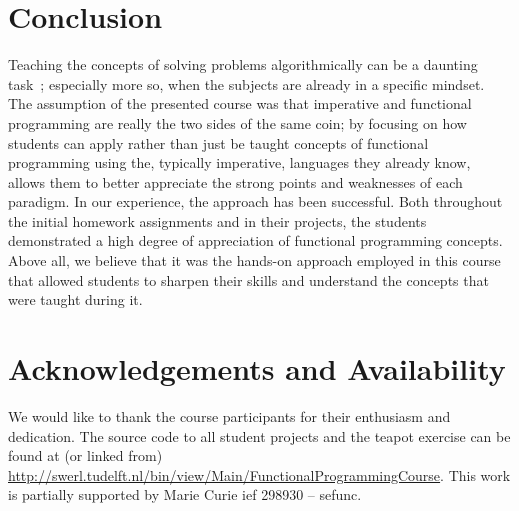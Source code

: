 \documentclass[conference]{IEEEtran}
\begin{document}
\section{Conclusion}

Teaching the concepts of solving problems algorithmically can be a daunting
task~\cite{Futsc06}; especially more so, when the subjects are already in a
specific mindset. The assumption of the presented course was that imperative and
functional programming are really the two sides of the same coin; by focusing on
how students can apply rather than just be taught concepts of functional
programming using the, typically imperative, languages they already know, allows
them to better appreciate the strong points and weaknesses of each paradigm. In
our experience, the approach has been successful. Both throughout the initial
homework assignments and in their projects, the students demonstrated a high
degree of appreciation of functional programming concepts. Above all, we
believe that it was the hands-on approach 
employed in this course that allowed students to sharpen their skills and
understand the concepts that were taught during it.

\section*{Acknowledgements and Availability}
We would like to thank the course participants for their enthusiasm and
dedication. The source code to all student projects and the teapot
exercise can be found at (or linked from) \url{http://swerl.tudelft.nl/bin/view/Main/FunctionalProgrammingCourse}. This work is partially supported by
Marie Curie {\sc ief} 298930 -- {\sc sefunc}.



\end{document}
